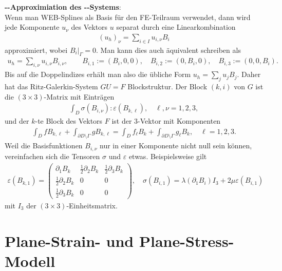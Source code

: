 \textbf{--Approximiation des --Systems}:\\
Wenn man WEB-Splines als Basis für den FE-Teilraum verwendet, dann wird jede Komponente $u_\nu$
des Vektors $u$ separat durch eine Linearkombination
\begin{align*}
    (u_h)_\nu = \sum_{i \in I} u_{i,\nu} B_i
\end{align*}
approximiert, wobei $B_i|_\Gamma = 0$.
Man kann dies auch äquivalent schreiben als
\begin{align*}
    u_h = \sum_{i,\nu} u_{i,\nu} B_{i,\nu},\qquad
    B_{i,1} := (B_i, 0, 0),\quad
    B_{i,2} := (0, B_i, 0),\quad
    B_{i,3} := (0, 0, B_i).
\end{align*}
Bis auf die Doppelindizes erhält man also die übliche Form $u_h = \sum_j u_j B_j$.
Daher hat das Ritz-Galerkin-System $GU = F$ Blockstruktur.
Der Block $(k, i)$ von $G$ ist die $(3 \times 3)$-Matrix mit Einträgen
\begin{align*}
    \int_D \sigma(B_{i,\nu}):\varepsilon(B_{k,\ell}),\quad
    \ell, \nu = 1, 2, 3,
\end{align*}
und der $k$-te Block des Vektors $F$ ist der $3$-Vektor mit Komponenten
\begin{align*}
    \int_D f B_{k,\ell} + \int_{\partial D \setminus \Gamma} g B_{k,\ell}
    = \int_D f_\ell B_k + \int_{\partial D \setminus \Gamma} g_\ell B_k,\quad
    \ell = 1, 2, 3.
\end{align*}
Weil die Basisfunktionen $B_{i,\nu}$ nur in einer Komponente nicht null sein können,
vereinfachen sich die Tensoren $\sigma$ und $\varepsilon$ etwas.
Beispielsweise gilt
\begin{align*}
    \varepsilon(B_{k,1})
    = \begin{pmatrix}\partial_1 B_k & \frac{1}{2} \partial_2 B_k & \frac{1}{2} \partial_3 B_k\\
    \frac{1}{2} \partial_2 B_k & 0 & 0\\
    \frac{1}{2} \partial_3 B_k & 0 & 0\end{pmatrix},\quad
    \sigma(B_{i,1}) = \lambda (\partial_1 B_i) I_3 + 2\mu \varepsilon(B_{i,1})
\end{align*}
mit $I_3$ der $(3 \times 3)$-Einheitsmatrix.

\pagebreak

\section{%
    Plane-Strain- und Plane-Stress-Modell%
}


